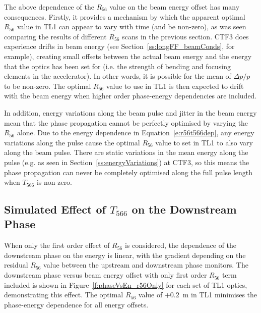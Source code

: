 The above dependence of the \(R_{56}\) value on the beam energy offset has many consequences. Firstly, it provides a mechanism by which the apparent optimal \(R_{56}\) value in TL1 can appear to vary with time (and be non-zero), as was seen comparing the results of different \(R_{56}\) scans in the previous section. CTF3 does experience drifts in beam energy (see Section~\ref{ss:longFF_beamConds}, for example), creating small offsets between the actual beam energy and the energy that the optics has been set for (i.e. the strength of bending and focusing elements in the accelerator). In other words, it is possible for the mean of \(\Delta p / p\) to be non-zero. The optimal \(R_{56}\) value to use in TL1 is then expected to drift with the beam energy when higher order phase-energy dependencies are included.

In addition, energy variations along the beam pulse and jitter in the beam energy mean that the phase propagation cannot be perfectly optimised by varying the \(R_{56}\) alone. Due to the energy dependence in Equation~\ref{e:r56t566dep}, any energy variations along the pulse cause the optimal \(R_{56}\) value to set in TL1 to also vary along the beam pulse. There are static variations in the mean energy along the pulse (e.g. as seen in Section~\ref{ss:energyVariations}) at CTF3, so this means the phase propagation can never be completely optimised along the full pulse length when \(T_{566}\) is non-zero. 

\subsection{Simulated Effect of \(T_{566}\) on the Downstream Phase}
\label{ss:t566Sim}

When only the first order effect of \(R_{56}\) is considered, the dependence of the downstream phase on the energy is linear, with the gradient depending on the residual \(R_{56}\) value between the upstream and downstream phase monitors. The downstream phase versus beam energy offset with only first order \(R_{56}\) term included is shown in Figure~\ref{f:phaseVsEn_r56Only} for each set of TL1 optics, demonstrating this effect. The optimal \(R_{56}\) value of \(+0.2\)~m in TL1 minimises the phase-energy dependence for all energy offsets.

